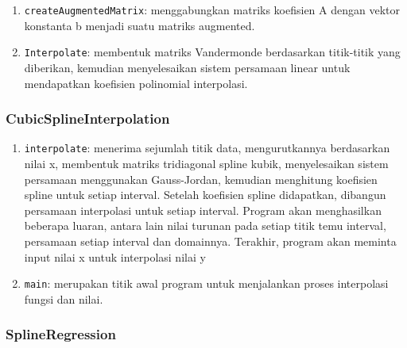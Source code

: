 \documentclass{article}
\begin{document}
\begin{enumerate}

    \item{\texttt{createAugmentedMatrix}: menggabungkan matriks koefisien A dengan vektor konstanta b menjadi suatu matriks augmented.}

    \item{\texttt{Interpolate}: membentuk matriks Vandermonde berdasarkan titik-titik yang diberikan, kemudian menyelesaikan sistem persamaan linear untuk mendapatkan koefisien polinomial interpolasi.}

\end{enumerate}


\subsubsection{CubicSplineInterpolation}


 \begin{enumerate} 

     \item{\texttt{interpolate}: menerima sejumlah titik data, mengurutkannya berdasarkan nilai x, membentuk matriks tridiagonal spline kubik, menyelesaikan sistem persamaan menggunakan Gauss-Jordan, kemudian menghitung koefisien spline untuk setiap interval. \cite{g4g} Setelah koefisien spline didapatkan, dibangun persamaan interpolasi untuk setiap interval. Program akan menghasilkan beberapa luaran, antara lain nilai turunan pada setiap titik temu interval, persamaan setiap interval dan domainnya. Terakhir, program akan meminta input nilai x untuk interpolasi nilai y}  

    \item{\texttt{main}: merupakan titik awal program untuk menjalankan proses interpolasi fungsi dan nilai.}

\end{enumerate}


\subsubsection{SplineRegression}

\end{document}
